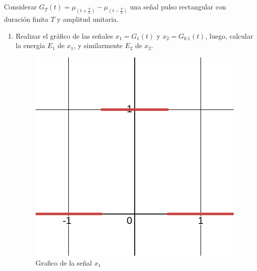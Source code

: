 \documentclass[12pt,a4paper]{report}
\begin{document}
\chapter{}%

Considerar $G_T(t) = \mu_{(t + \frac{T}{2})} - \mu_{(t - \frac{T}{2})}$ una señal pulso rectangular con duración finita
$T$ y amplitud unitaria.

\begin{enumerate}[label=\alph*),left=0pt]

  \item Realizar el gráfico de las señales $x_1 = G_1(t)$ y $x_2 = G_{0.1}(t)$, luego, calcular la energía $E_1$ de 
    $x_1$, y similarmente $E_2$ de $x_2$.

    \begin{figure}[h!]
      \hspace{6mm}
      \begin{minipage}{0.45\textwidth}
        \centering
        \includegraphics[width=\textwidth]{images/ej3.1}
        \caption{Grafico de la señal $x_1$}
        \label{fig:imagen1}
      \end{minipage}
      \hfill
      \begin{minipage}{0.45\textwidth}

\end{minipage}
\end{figure}
\end{enumerate}
\end{document}
